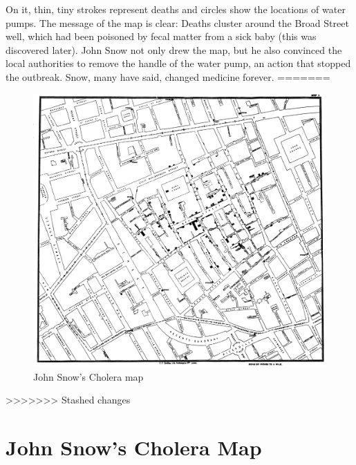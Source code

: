 \documentclass[12pt]{article}
\begin{document}
On it, thin, tiny strokes represent deaths and circles show the locations of water pumps. The message of the map is clear: Deaths cluster around the Broad Street well, which had been poisoned by fecal matter from a sick baby (this was discovered later). John Snow not only drew the map, but he also convinced the local authorities to remove the handle of the water pump, an action that stopped the outbreak. Snow, many have said, changed medicine forever. \cite{heros}
=======
\begin{figure}
\centering
\includegraphics[scale=0.1]{Snow-cholera-map-1}
\caption{John Snow's Cholera map}
\label{fig:snow}
\end{figure}
>>>>>>> Stashed changes


\section{John Snow's Cholera Map}
\end{document}
